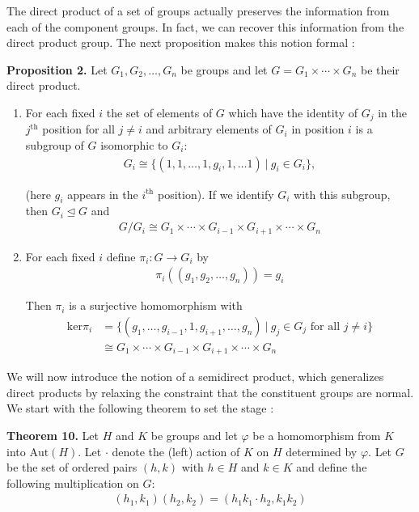 \documentclass[11pt, reqno]{amsart}
\theoremstyle{plain}
\theoremstyle{definition}
\theoremstyle{example}
\def\normeq{\unlhd}
\begin{document}
The direct product of a set of groups actually preserves the information from each of the component groups. In fact, we can recover this information from the direct product group. The next proposition makes this notion formal \cite[\S 5.1, p. 154]{dummit}:

\newpage
\par
\textbf{Proposition 2.} Let $G_1, G_2, \ldots, G_n$ be groups and let $G = G_1 \times \cdots \times G_n$ be their direct product.
\begin{enumerate}
\item For each fixed $i$ the set of elements of $G$ which have the identity of $G_j$ in the $j^{\text{th}}$ position for all $j \neq i$ and arbitrary elements of $G_i$ in position $i$ is a subgroup of $G$ isomorphic to $G_i$:
\begin{align*}
G_i \cong \{(1, 1, \ldots, 1, g_i, 1, \ldots 1) \ | \ g_i \in G_i\},
\end{align*}

(here $g_i$ appears in the $i^{\text{th}}$ position). If we identify $G_i$ with this subgroup, then $G_i \normeq G$ and 
\begin{align*}
G/G_i \cong G_1 \times \cdots \times G_{i-1} \times G_{i+1} \times \cdots \times G_n
\end{align*}

\item For each fixed $i$ define $\pi_i: G \to G_i$ by
\begin{align*}
\pi_i((g_1, g_2, \ldots, g_n)) = g_i
\end{align*}

Then $\pi_i$ is a surjective homomorphism with
\begin{align*}
\text{ker}\pi_i &= \{(g_1, \ldots, g_{i-1}, 1, g_{i+1}, \ldots, g_n) \ | \ g_j \in G_j \text{ for all } j \neq i\}\\
&\cong G_1 \times \cdots \times G_{i-1} \times G_{i+1} \times \cdots \times G_n
\end{align*}
\end{enumerate}

We will now introduce the notion of a semidirect product, which generalizes direct products by relaxing the constraint that the constituent groups are normal. We start with the following theorem to set the stage \cite[\S 5.5, p. 176]{dummit}:

\par
\textbf{Theorem 10.} Let $H$ and $K$ be groups and let $\varphi$ be a homomorphism from $K$ into $\text{Aut}(H)$. Let $\cdot$ denote the (left) action of $K$ on $H$ determined by $\varphi$. Let $G$ be the set of ordered pairs $(h, k)$ with $h \in H$ and $k \in K$ and define the following multiplication on $G$:
\begin{align*}
(h_1, k_1)(h_2, k_2) = (h_1 k_1 \cdot h_2, k_1k_2)
\end{align*}
\end{document}
